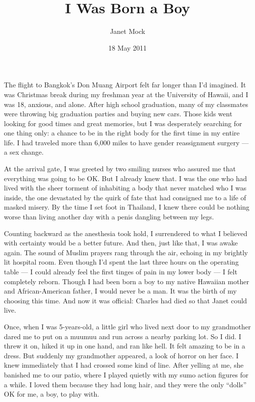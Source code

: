 \documentclass{article}
\title{I Was Born a Boy}
\author{Janet Mock}
\date{18 May 2011}
\begin{document}
\maketitle

The flight to Bangkok's Don Muang Airport felt far longer than I'd imagined. It
was Christmas break during my freshman year at the University of Hawaii, and I
was 18, anxious, and alone. After high school graduation, many of my classmates
were throwing big graduation parties and buying new cars. Those kids went
looking for good times and great memories, but I was desperately searching for
one thing only: a chance to be in the right body for the first time in my
entire life. I had traveled more than 6,000 miles to have gender reassignment
surgery --- a sex change.

At the arrival gate, I was greeted by two smiling nurses who assured me that
everything was going to be OK. But I already knew that. I was the one who had
lived with the sheer torment of inhabiting a body that never matched who I was
inside, the one devastated by the quirk of fate that had consigned me to a life
of masked misery. By the time I set foot in Thailand, I knew there could be
nothing worse than living another day with a penis dangling between my legs.

Counting backward as the anesthesia took hold, I surrendered to what I believed
with certainty would be a better future. And then, just like that, I was awake
again. The sound of Muslim prayers rang through the air, echoing in my brightly
lit hospital room. Even though I'd spent the last three hours on the operating
table --- I could already feel the first tinges of pain in my lower body --- I
felt completely reborn. Though I had been born a boy to my native Hawaiian
mother and African-American father, I would never be a man. It was the birth of
my choosing this time. And now it was official: Charles had died so that Janet
could live.

Once, when I was 5-years-old, a little girl who lived next door to my
grandmother dared me to put on a muumuu and run across a nearby parking lot. So
I did. I threw it on, hiked it up in one hand, and ran like hell. It felt
amazing to be in a dress. But suddenly my grandmother appeared, a look of
horror on her face. I knew immediately that I had crossed some kind of line.
After yelling at me, she banished me to our patio, where I played quietly with
my sumo action figures for a while. I loved them because they had long hair,
and they were the only ``dolls'' OK for me, a boy, to play with.
\end{document}
